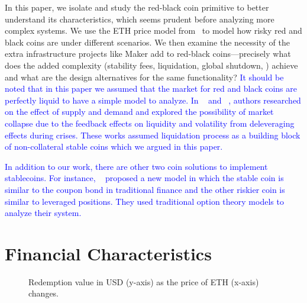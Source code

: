 In this paper, we isolate and study the red-black coin primitive to better understand its characteristics, which seems prudent before analyzing more complex systems. We use the ETH price model from~\cite{GPH+20} to model how risky red and black coins are under different scenarios. We then examine the necessity of the extra infrastructure projects like Maker add to red-black coins---precisely what does the added complexity (\eg stability fees, liquidation, global shutdown, \etc) achieve and what are the design alternatives for the same functionality? 
\textcolor{blue}{It should be noted that in this paper we assumed that the market for red and black coins are perfectly liquid to have a simple model to analyze. In ~\cite{klages2019stability} and ~\cite{KMM20}, authors researched on the effect of supply and demand and explored the possibility of market collapse due to the feedback effects on liquidity and volatility from deleveraging effects during crises. These works assumed liquidation process as a building block of non-collateral stable coins which we argued in this paper.}

\textcolor{blue}{In addition to our work, there are other two coin solutions to implement stablecoins. For instance, ~\cite{DUOnet}  proposed a new model in which the stable coin is similar to the coupon bond in traditional finance and the other riskier coin is similar to leveraged positions. They used traditional option theory models to analyze their system.}



\section{Financial Characteristics}


\begin{figure}[t]
    \centering
        \qquad
    \caption{Redemption value in USD (y-axis) as the price of ETH (x-axis) changes. \label{fig:price1} \label{fig:price2}}
\end{figure}

